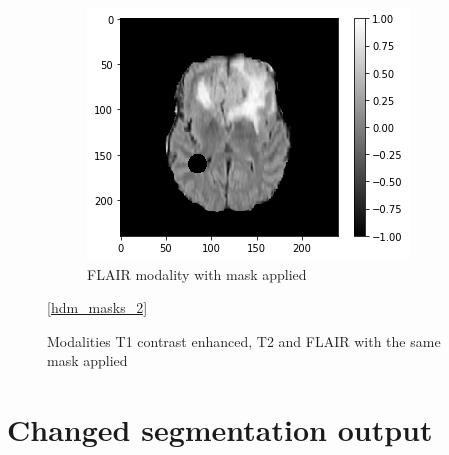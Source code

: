 \begin{figure}[H]
    \begin{subfigure}[t]{.33\textwidth}
        \centering
        \includegraphics[width=\linewidth]{chapters/06_hdm/images_masked/masked_3.png}
        \caption{FLAIR modality with mask applied}
    \end{subfigure}
    \caption{Modalities T1 contrast enhanced, T2 and FLAIR with the same mask applied}
    \ref{hdm_masks_2}
\end{figure}



\section{Changed segmentation output}

